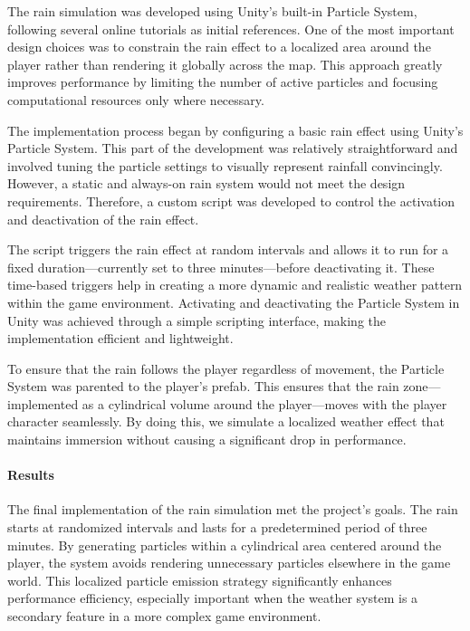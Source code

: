 \documentclass{article}
\begin{document}
The rain simulation was developed using Unity's built-in Particle System, following several online tutorials as initial references. One of the most important design choices was to constrain the rain effect to a localized area around the player rather than rendering it globally across the map. This approach greatly improves performance by limiting the number of active particles and focusing computational resources only where necessary.

The implementation process began by configuring a basic rain effect using Unity's Particle System. This part of the development was relatively straightforward and involved tuning the particle settings to visually represent rainfall convincingly. However, a static and always-on rain system would not meet the design requirements. Therefore, a custom script was developed to control the activation and deactivation of the rain effect.

The script triggers the rain effect at random intervals and allows it to run for a fixed duration—currently set to three minutes—before deactivating it. These time-based triggers help in creating a more dynamic and realistic weather pattern within the game environment. Activating and deactivating the Particle System in Unity was achieved through a simple scripting interface, making the implementation efficient and lightweight.

To ensure that the rain follows the player regardless of movement, the Particle System was parented to the player's prefab. This ensures that the rain zone—implemented as a cylindrical volume around the player—moves with the player character seamlessly. By doing this, we simulate a localized weather effect that maintains immersion without causing a significant drop in performance.

\paragraph{Results}\hfill

The final implementation of the rain simulation met the project's goals. The rain starts at randomized intervals and lasts for a predetermined period of three minutes. By generating particles within a cylindrical area centered around the player, the system avoids rendering unnecessary particles elsewhere in the game world. This localized particle emission strategy significantly enhances performance efficiency, especially important when the weather system is a secondary feature in a more complex game environment.
\end{document}
